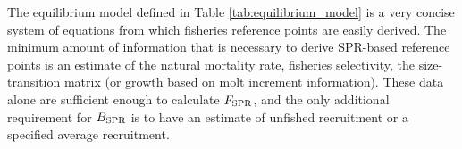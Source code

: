 \documentclass[12pt,letterpaper]{article}
\begin{document}

    The equilibrium model defined  in Table \ref{tab:equilibrium_model} is a very concise system of equations from which fisheries reference points are easily derived.  The minimum amount of information that is necessary to derive SPR-based reference points is an estimate of the natural mortality rate, fisheries selectivity, the size-transition matrix (or growth based on molt increment information).  These data alone are sufficient enough to calculate $F_{\rm{SPR}}$, and the only additional requirement for $B_{\rm{SPR}}$ is to have an estimate of unfished recruitment or a specified average recruitment.

\end{document}
